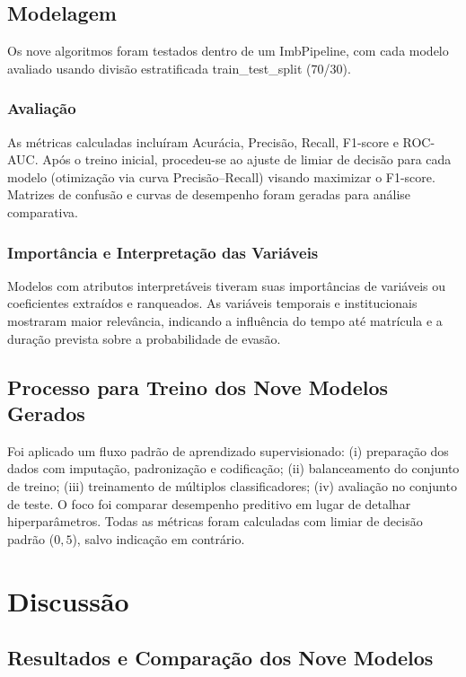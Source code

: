 \documentclass[english, spanish, brazilian]{RBIEarticle} %
\begin{document}
\subsection{Modelagem}
Os nove algoritmos foram testados dentro de um ImbPipeline, com cada modelo avaliado usando divisão estratificada train\_test\_split (70/30).

\subsubsection{Avaliação}
As métricas calculadas incluíram Acurácia, Precisão, Recall, F1-score e ROC-AUC. Após o treino inicial, procedeu-se ao ajuste de limiar de decisão para cada modelo (otimização via curva Precisão–Recall) visando maximizar o F1-score. Matrizes de confusão e curvas de desempenho foram geradas para análise comparativa.

\subsubsection{Importância e Interpretação das Variáveis}
Modelos com atributos interpretáveis tiveram suas importâncias de variáveis ou coeficientes extraídos e ranqueados. As variáveis temporais e institucionais mostraram maior relevância, indicando a influência do tempo até matrícula e a duração prevista sobre a probabilidade de evasão.

\subsection{Processo para Treino dos Nove Modelos Gerados}

Foi aplicado um fluxo padrão de aprendizado supervisionado: (i) preparação dos dados com imputação, padronização e codificação; (ii) balanceamento do conjunto de treino; (iii) treinamento de múltiplos classificadores; (iv) avaliação no conjunto de teste. O foco foi comparar desempenho preditivo em lugar de detalhar hiperparâmetros. Todas as métricas foram calculadas com limiar de decisão padrão ($0{,}5$), salvo indicação em contrário.


\section{Discussão}

\subsection{Resultados e Comparação dos Nove Modelos}
\end{document}
